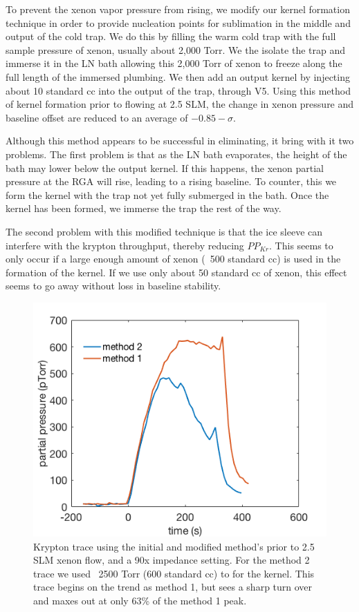 \documentclass[12pt]{article}
\begin{document}
To prevent the xenon vapor pressure from rising, we modify our kernel formation technique in order to provide nucleation points for sublimation in the middle and output of the cold trap. We do this by filling the warm cold trap with the full sample pressure of xenon, usually about 2,000 Torr. We the isolate the trap and immerse it in the LN bath allowing this 2,000 Torr of xenon to freeze along the full length of the immersed plumbing. We then add an output kernel by injecting about 10 standard cc into the output of the trap, through V5. Using this method of kernel formation prior to flowing at 2.5 SLM, the change in xenon pressure and baseline offset are reduced to an average of $-0.85-\sigma$. 

Although this method appears to be successful in eliminating, it bring with it two problems. The first problem is that as the LN bath evaporates, the height of the bath may lower below the output kernel. If this happens, the xenon partial pressure at the RGA will rise, leading to a rising baseline. To counter, this we form the kernel with the trap not yet fully submerged in the bath. Once the kernel has been formed, we immerse the trap the rest of the way.

The second problem with this modified technique is that the ice sleeve can interfere with the krypton throughput, thereby reducing $PP_{Kr}$. This seems to only occur if a large enough amount of xenon (~500 standard cc) is used in the formation of the kernel. If we use only about 50 standard cc of xenon, this effect seems to go away without loss in baseline stability. 
\begin{figure}[h!]
\centering
\includegraphics[width=\textwidth]{Figures/ice_form_Krloss.png}
\caption{Krypton trace using the initial and modified method's prior to 2.5 SLM xenon flow, and a 90x impedance setting. For the method 2 trace we used ~2500 Torr (600 standard cc) to for the kernel. This trace begins on the trend as method 1, but sees a sharp turn over and maxes out at only 63\% of the method 1 peak. } 
\label{fig:iceformkrloss}
\end{figure} 
\end{document}
